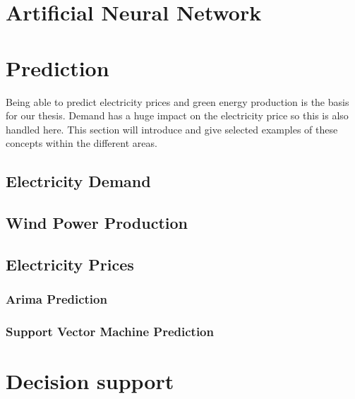 \documentclass[twoside,11pt,openright]{report}
\begin{document}
\newpage
\section{Artificial Neural Network}



\newpage
\section{Prediction}
Being able to predict electricity prices and green energy production is the basis for our thesis. Demand has a huge impact on the electricity price so this is also handled here. This section will introduce and give selected examples of these concepts within the different areas. 

\subsection{Electricity Demand}


\subsection{Wind Power Production}


\subsection{Electricity Prices}


\subsubsection{Arima Prediction}
 
\subsubsection{Support Vector Machine Prediction}



\newpage
\section{Decision support}
\end{document}
